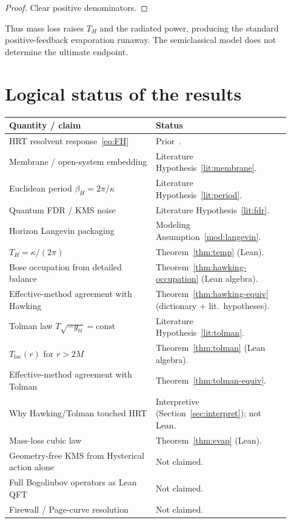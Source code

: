\documentclass[11pt]{article}
\theoremstyle{definition}
\theoremstyle{remark}
\begin{document}
\begin{proof}
Clear positive denominators.
\end{proof}

Thus mass loss raises $T_H$ and the radiated power, producing the standard positive-feedback
evaporation runaway.
The semiclassical model does not determine the ultimate endpoint.

\section{Logical status of the results}
\label{sec:status}
\begin{center}
\small
\begin{tabular}{@{}p{0.48\linewidth}p{0.44\linewidth}@{}}
\toprule
\textbf{Quantity / claim} & \textbf{Status}\\
\midrule
HRT resolvent response~\eqref{eq:FH} & Prior~\cite{boyd2026response}.\\
Membrane / open-system embedding & Literature Hypothesis~\ref{lit:membrane}.\\
Euclidean period $\beta_H=2\pi/\kappa$ & Literature Hypothesis~\ref{lit:period}.\\
Quantum FDR / KMS noise & Literature Hypothesis~\ref{lit:fdr}.\\
Horizon Langevin packaging & Modeling Assumption~\ref{mod:langevin}.\\
$T_H=\kappa/(2\pi)$ & Theorem~\ref{thm:temp} (Lean).\\
Bose occupation from detailed balance & Theorem~\ref{thm:hawking-occupation} (Lean algebra).\\
Effective-method agreement with Hawking & Theorem~\ref{thm:hawking-equiv}
(dictionary + lit.\ hypotheses).\\
Tolman law $T\sqrt{-g_{tt}}=\mathrm{const}$ & Literature Hypothesis~\ref{lit:tolman}.\\
$T_{\mathrm{loc}}(r)$ for $r>2M$ & Theorem~\ref{thm:tolman} (Lean algebra).\\
Effective-method agreement with Tolman & Theorem~\ref{thm:tolman-equiv}.\\
Why Hawking/Tolman touched HRT & Interpretive (Section~\ref{sec:interpret}); not Lean.\\
Mass-loss cubic law & Theorem~\ref{thm:evap} (Lean).\\
Geometry-free KMS from Hysterical action alone & Not claimed.\\
Full Bogoliubov operators as Lean QFT & Not claimed.\\
Firewall / Page-curve resolution & Not claimed.\\
\bottomrule
\end{tabular}
\end{center}
\end{document}
